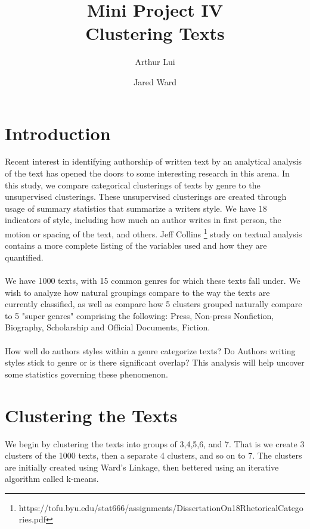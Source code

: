 \documentclass[11pt]{article}
\begin{document}
\onehalfspacing

\title{Mini Project IV \\
Clustering Texts} 
\author{Arthur Lui \and Jared Ward}

\maketitle

\section*{Introduction}
Recent interest in identifying authorship of written text by an analytical
analysis of the text has opened the doors to some interesting research in this
arena. In this study, we compare categorical clusterings of texts by genre to
the unsupervised clusterings. These unsupervised clusterings are created through
usage of summary statistics that summarize a writers style. We have 18
indicators of style, including how much an author writes in first person, the
motion or spacing of the text, and others.  Jeff Collins
\footnote{https://tofu.byu.edu/stat666/assignments/DissertationOn18RhetoricalCategories.pdf}
study on textual analysis contains a more complete listing of the variables used
and how they are quantified. 
\\
\\
We have 1000 texts, with 15 common genres for which these texts fall under. We
wish to analyze how natural groupings compare to the way the texts are currently
classified, as well as compare how 5 clusters grouped naturally compare to 5
"super genres" comprising the following: Press, Non-press Nonfiction, Biography,
Scholarship and Official Documents, Fiction. 
\\
\\
How well do authors styles within a genre categorize texts? Do Authors writing
styles stick to genre or is there significant overlap? This analysis will help
uncover some statistics governing these phenomenon.  

\section*{Clustering the Texts}
We begin by clustering the texts into groups of 3,4,5,6, and 7. That is we
create 3 clusters of the 1000 texts, then a separate 4 clusters, and so on to 7.
The clusters are initially created using Ward's Linkage, then bettered using an
iterative algorithm called k-means.
\end{document}
